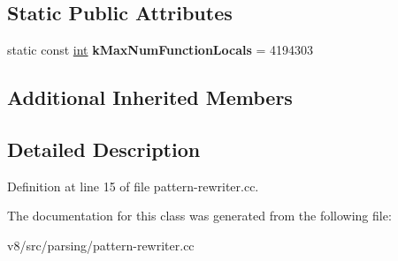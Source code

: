 \subsection*{Static Public Attributes}
\begin{DoxyCompactItemize}
\item 
\mbox{\label{classv8_1_1internal_1_1PatternRewriter_afcf01279a288a5d30cbaefac40fd4f05}} 
static const \mbox{\hyperlink{classint}{int}} {\bfseries k\+Max\+Num\+Function\+Locals} = 4194303
\end{DoxyCompactItemize}
\subsection*{Additional Inherited Members}


\subsection{Detailed Description}


Definition at line 15 of file pattern-\/rewriter.\+cc.



The documentation for this class was generated from the following file\+:\begin{DoxyCompactItemize}
\item 
v8/src/parsing/pattern-\/rewriter.\+cc\end{DoxyCompactItemize}
